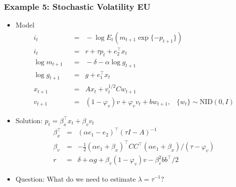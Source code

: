 \documentclass{beamer}
\begin{document}

\begin{frame}
\frametitle{Example 5: Stochastic Volatility EU}
\begin{itemize} \itemsep=\bigskipamount
\item Model
\begin{align*}
    i_t &\;\;=\;\;  - \log E_t \left( m_{t+1} \exp\{- p_{t+1}\} \right)  \tag{Euler equation} \\
    i_t &\;\;=\;\;  r + \tau p_{t} +  e_2^\top x_{t} \tag{Taylor rule} \\
    \log m_{t+1} &\;\;=\;\; - \delta - \alpha \log g_{t+1} \\
    \log g_{t+1} &\;\;=\;\; g + e_1^\top x_t \\
    x_{t+1} &\;\;=\;\; A x_{t} + v_{t}^{1/2} C w_{t+1} \\
    v_{t+1} &\;\;=\;\; (1-\varphi_{v})v+\varphi_{v}v_{t}+bw_{t+1},
            \;\;\;\{ w_t \} \sim \mbox{NID}(0,I)
\end{align*}
\item Solution:  $ p_t = \beta_{x}^\top x_t +\beta_{v} v_{t}$ 
\begin{eqnarray*}
    \beta^\top_{x} &=& (\alpha e_1 - e_2)^\top (\tau I - A)^{-1} \\
    \beta_{v} &=& -\frac{1}{2}(\alpha e_1 + \beta_{x})^\top C C^\top (\alpha e_1 + \beta_{x})/(\tau-\varphi_{v}) \\
    r &=& \delta + \alpha g + \beta_{v} (1-\varphi_{v})v -\beta_{v}^{2}bb^{\top}/2
\end{eqnarray*}

\item Question:  What do we need to estimate $\lambda = \tau^{-1}$?
\end{itemize}
\end{frame}
\end{document}
